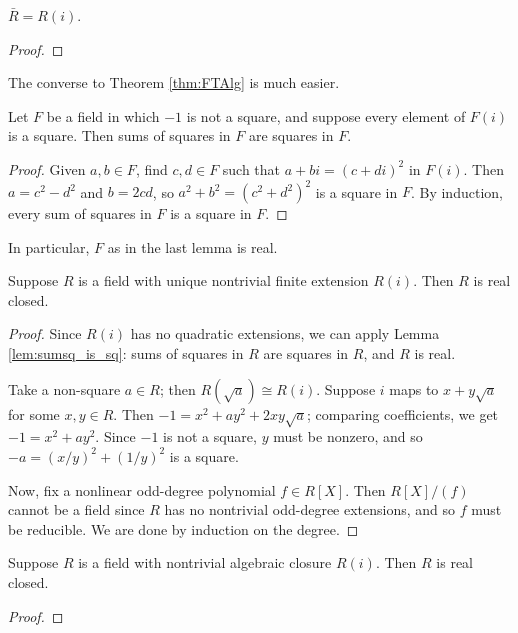 \begin{corollary}
  \label{cor:RCF_ac}
  \leanok
  $\bar{R}=R(i)$.
\end{corollary}
\begin{proof}
  \leanok
\end{proof}

The converse to Theorem \ref{thm:FTAlg} is much easier.

\begin{lemma}
  \label{lem:sumsq_is_sq}
  Let $F$ be a field in which $-1$ is not a square, and suppose every element of $F(i)$ is a square. Then sums of squares in $F$ are squares in $F$.
\end{lemma}
\begin{proof}
  Given $a,b\in F$, find $c,d\in F$ such that $a+bi=(c+di)^2$ in $F(i)$. Then $a=c^2-d^2$ and $b=2cd$, so $a^2+b^2=(c^2+d^2)^2$ is a square in $F$. By induction, every sum of squares in $F$ is a square in $F$.
\end{proof}

In particular, $F$ as in the last lemma is real.

\begin{lemma}
  \label{lem:FTAlg_converse}
  Suppose $R$ is a field with unique nontrivial finite extension $R(i)$. Then $R$ is real closed.
\end{lemma}
\begin{proof}
  Since $R(i)$ has no quadratic extensions, we can apply Lemma \ref{lem:sumsq_is_sq}: sums of squares in $R$ are squares in $R$, and $R$ is real.

  Take a non-square $a\in R$; then $R(\sqrt{a})\cong R(i)$. Suppose $i$ maps to $x+y\sqrt{a}$ for some $x,y\in R$. Then $-1=x^2+ay^2+2xy\sqrt{a}$; comparing coefficients, we get $-1=x^2+ay^2$. Since $-1$ is not a square, $y$ must be nonzero, and so $-a=(x/y)^2+(1/y)^2$ is a square.

  Now, fix a nonlinear odd-degree polynomial $f\in R[X]$. Then $R[X]/(f)$ cannot be a field since $R$ has no nontrivial odd-degree extensions, and so $f$ must be reducible. We are done by induction on the degree.
\end{proof}

\begin{corollary}
  \label{lem:FTAlg_converse_alg_closure}
  Suppose $R$ is a field with nontrivial algebraic closure $R(i)$. Then $R$ is real closed.
\end{corollary}
\begin{proof}
\end{proof}

